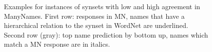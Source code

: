 \begin{figure}
\begin{minipage}[b]{0.5\linewidth}
{\begin{tabular}{p{2.6cm}|p{2.6cm}|p{2.6cm}|p{2.6cm}|p{2.6cm}|p{2.6cm}}
			\end{tabular}
		}
	\end{minipage}
	\caption{Examples for instances of \vgenome synsets with low and high agreement in ManyNames. 
		First row: responses in MN, names that have a hierarchical relation to the \vgenome synset in WordNet are underlined.
	Second row (gray): top name prediction by bottom up, names which match a MN response are in italics.}
	\label{fig:ex-high-low-agreement}
\end{figure}

